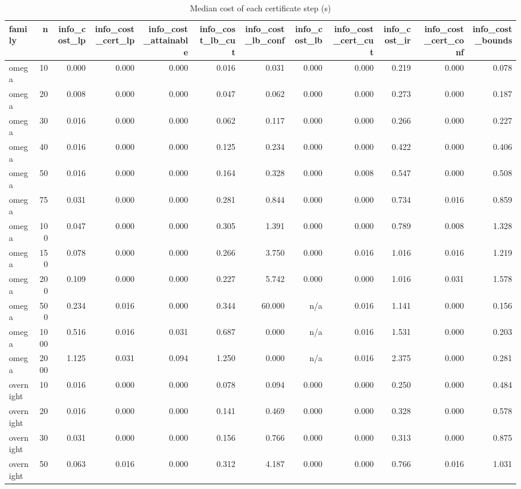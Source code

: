 \begin{table}[htbp]
\centering
\small
\caption{Median cost of each certificate step (s)}
\label{tab:E1_certificates_costs}
\begin{tabular}{lrrrrrrrrrrr}
\toprule
family & n & info\_cost\_lp & info\_cost\_cert\_lp & info\_cost\_attainable & info\_cost\_lb\_cut & info\_cost\_lb\_conf & info\_cost\_lb & info\_cost\_cert\_cut & info\_cost\_ir & info\_cost\_cert\_conf & info\_cost\_bounds \\
\midrule
omega & 10 & 0.000 & 0.000 & 0.000 & 0.016 & 0.031 & 0.000 & 0.000 & 0.219 & 0.000 & 0.078 \\
omega & 20 & 0.008 & 0.000 & 0.000 & 0.047 & 0.062 & 0.000 & 0.000 & 0.273 & 0.000 & 0.187 \\
omega & 30 & 0.016 & 0.000 & 0.000 & 0.062 & 0.117 & 0.000 & 0.000 & 0.266 & 0.000 & 0.227 \\
omega & 40 & 0.016 & 0.000 & 0.000 & 0.125 & 0.234 & 0.000 & 0.000 & 0.422 & 0.000 & 0.406 \\
omega & 50 & 0.016 & 0.000 & 0.000 & 0.164 & 0.328 & 0.000 & 0.008 & 0.547 & 0.000 & 0.508 \\
omega & 75 & 0.031 & 0.000 & 0.000 & 0.281 & 0.844 & 0.000 & 0.000 & 0.734 & 0.016 & 0.859 \\
omega & 100 & 0.047 & 0.000 & 0.000 & 0.305 & 1.391 & 0.000 & 0.000 & 0.789 & 0.008 & 1.328 \\
omega & 150 & 0.078 & 0.000 & 0.000 & 0.266 & 3.750 & 0.000 & 0.016 & 1.016 & 0.016 & 1.219 \\
omega & 200 & 0.109 & 0.000 & 0.000 & 0.227 & 5.742 & 0.000 & 0.000 & 1.016 & 0.031 & 1.578 \\
omega & 500 & 0.234 & 0.016 & 0.000 & 0.344 & 60.000 & n/a & 0.016 & 1.141 & 0.000 & 0.156 \\
omega & 1000 & 0.516 & 0.016 & 0.031 & 0.687 & 0.000 & n/a & 0.016 & 1.531 & 0.000 & 0.203 \\
omega & 2000 & 1.125 & 0.031 & 0.094 & 1.250 & 0.000 & n/a & 0.016 & 2.375 & 0.000 & 0.281 \\
overnight & 10 & 0.016 & 0.000 & 0.000 & 0.078 & 0.094 & 0.000 & 0.000 & 0.250 & 0.000 & 0.484 \\
overnight & 20 & 0.016 & 0.000 & 0.000 & 0.141 & 0.469 & 0.000 & 0.000 & 0.328 & 0.000 & 0.578 \\
overnight & 30 & 0.031 & 0.000 & 0.000 & 0.156 & 0.766 & 0.000 & 0.000 & 0.313 & 0.000 & 0.875 \\
overnight & 50 & 0.063 & 0.016 & 0.000 & 0.312 & 4.187 & 0.000 & 0.000 & 0.766 & 0.016 & 1.031 \\

\end{tabular}
\end{table}
